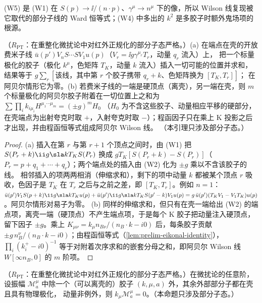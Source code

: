 (W5) 是 (W1) 在 $S(p)\to\ii/(n\cdot p)$、$\gamma^\mu\to n^\mu$ 下的像，所以 Wilson 线复现被它取代的部分子线的 Ward 恒等式；(W4) 中多出的 $k^2$ 是多胶子时额外鬼场项的根源。

\begin{lemma}\label{lem:method-ward-abelian}
（$R_{\mathrm{PT}}$：在重整化微扰论中对红外正规化的部分子态严格。）(a) 在端点在壳的开放费米子线 $\bar u(p')V_nS\cdots SV_1u(p)$（$V_r=\ii g\gamma^{\mu_r}T_r$，动量 $q_r$ 流入）上，
把一个标量极化的胶子（极化 $k^\mu$，色矩阵 $T_K$，动量 $k$ 流入）插入一切可能的位置并求和，结果等于 $g\sum_r[\text{该线，其中第 }r\text{ 个胶子携带 }q_r+k\text{、色矩阵换为 }[T_K,T_r]]$；
在阿贝尔情形它为零。(b) 若费米子线的一端是硬顶点（离壳），另一端在壳，则 $m$ 个标量极化的阿贝尔胶子附着在一切位置上之和为 $\sum\prod_ik_{i\mu_i}H^{\mu_1\cdots\mu_m}=(\pm g)^mH_0$
（$H_0$ 为不含这些胶子、动量相应平移的硬部分，在壳端点为出射夸克时取 $+$，入射夸克时取 $-$）；程函因子只在乘上 K 投影之后才出现，并由程函恒等式组成阿贝尔 Wilson 线。
（本引理只涉及部分子态。）
\end{lemma}

\begin{proof}
(a) 插入在第 $r$ 与第 $r+1$ 个顶点之间时，由 (W1) 把 $S(P_r+k)\ii g\sla kT_KS(P_r)$ 换成 $gT_K[S(P_r+k)-S(P_r)]$（$P_r=p+q_1+\cdots+q_r$）；两个端点处的插入由 (W2) 化为 $\pm g$ 乘以不含该胶子的线。
相邻插入的项两两相消（伸缩求和），剩下的项中动量 $k$ 都被某个顶点 $r$ 吸收，色因子是 $T_K$ 在 $T_r$ 之后与之前之差，即 $[T_K,T_r]$。例如 $n=1$：
$\bar u(p')V_1S(p+k)\ii g\sla kT_Ku(p)+\bar u(p')\ii g\sla kT_KS(p'-k)V_1u(p)=g\,\bar u(p')(T_KV_1-V_1T_K)u(p)$。阿贝尔情形对易子为零。
(b) 同样的伸缩求和，但只有在壳一端给出 (W2) 的端点项，离壳一端（硬顶点）不产生端点项，于是每个 K 胶子把动量注入硬顶点，留下因子 $\pm g$。乘上
$K_{\mu\nu}=k_\mu n_{B\nu}/(n_B\cdot k-i0)$ 后，每条胶子贡献 $\pm g\,n_B^\nu/(n_B\cdot k-i0)$；由程函恒等式（\cref{lem:prelim-eikonal-identity}），
$\prod_i(k_i^+-i0)^{-1}$ 等于对附着次序求和的嵌套分母之和，即阿贝尔 Wilson 线 $W[\infty n_B,0]$ 的 $m$ 阶项。
\end{proof}

\begin{proposition}\label{prop:method-ward-one}
（$R_{\mathrm{PT}}$：在重整化微扰论中对红外正规化的部分子态严格。）在微扰论的任意阶，设振幅 $\mathcal M^\mu_a$ 中除一个（可以离壳的）胶子 $(k,\mu,a)$ 外，其余外部部分子都在壳且具有物理极化，
动量非例外，则 $k_\mu\mathcal M^\mu_a=0$。（本命题只涉及部分子态。）
\end{proposition}

